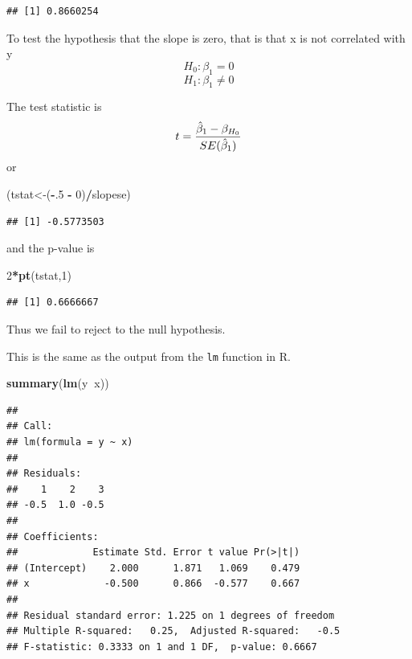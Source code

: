 \documentclass[]{book}
\newenvironment{Shaded}{\begin{snugshade}}{\end{snugshade}}
\newcommand{\KeywordTok}[1]{\textcolor[rgb]{0.13,0.29,0.53}{\textbf{#1}}}
\newcommand{\DecValTok}[1]{\textcolor[rgb]{0.00,0.00,0.81}{#1}}
\newcommand{\StringTok}[1]{\textcolor[rgb]{0.31,0.60,0.02}{#1}}
\newcommand{\OperatorTok}[1]{\textcolor[rgb]{0.81,0.36,0.00}{\textbf{#1}}}
\newcommand{\NormalTok}[1]{#1}
\theoremstyle{definition}
\theoremstyle{definition}
\theoremstyle{definition}
\theoremstyle{remark}
\begin{document}
\begin{verbatim}
## [1] 0.8660254
\end{verbatim}

To test the hypothesis that the slope is zero, that is that x is not
correlated with y \[H_{0}:\beta_{1}=0\] \[H_{1}:\beta_{1}\neq 0\]

The test statistic is
\[t={\hat{\beta}_{1} - \beta_{H_{0}} \over SE(\hat{\beta}_{1})}\] or

\begin{Shaded}
\begin{Highlighting}[]
\NormalTok{(tstat<-(}\OperatorTok{-}\NormalTok{.}\DecValTok{5} \OperatorTok{-}\StringTok{ }\DecValTok{0}\NormalTok{)}\OperatorTok{/}\NormalTok{slopese)}
\end{Highlighting}
\end{Shaded}

\begin{verbatim}
## [1] -0.5773503
\end{verbatim}

and the p-value is

\begin{Shaded}
\begin{Highlighting}[]
\DecValTok{2}\OperatorTok{*}\KeywordTok{pt}\NormalTok{(tstat,}\DecValTok{1}\NormalTok{)}
\end{Highlighting}
\end{Shaded}

\begin{verbatim}
## [1] 0.6666667
\end{verbatim}

Thus we fail to reject to the null hypothesis.

This is the same as the output from the \texttt{lm} function in R.

\begin{Shaded}
\begin{Highlighting}[]
\KeywordTok{summary}\NormalTok{(}\KeywordTok{lm}\NormalTok{(y}\OperatorTok{~}\NormalTok{x))}
\end{Highlighting}
\end{Shaded}

\begin{verbatim}
## 
## Call:
## lm(formula = y ~ x)
## 
## Residuals:
##    1    2    3 
## -0.5  1.0 -0.5 
## 
## Coefficients:
##             Estimate Std. Error t value Pr(>|t|)
## (Intercept)    2.000      1.871   1.069    0.479
## x             -0.500      0.866  -0.577    0.667
## 
## Residual standard error: 1.225 on 1 degrees of freedom
## Multiple R-squared:   0.25,  Adjusted R-squared:   -0.5 
## F-statistic: 0.3333 on 1 and 1 DF,  p-value: 0.6667
\end{verbatim}
\end{document}
